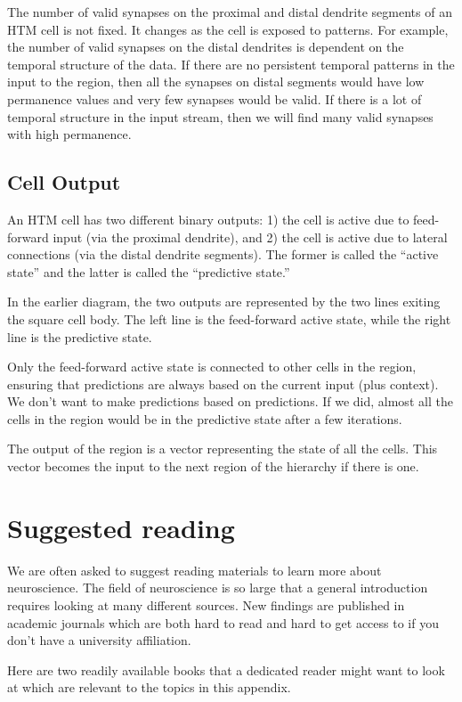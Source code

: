 The number of valid synapses on the proximal and distal dendrite
segments of an HTM cell is not fixed. It changes as the cell is
exposed to patterns. For example, the number of valid synapses on the
distal dendrites is dependent on the temporal structure of the
data. If there are no persistent temporal patterns in the input to the
region, then all the synapses on distal segments would have low
permanence values and very few synapses would be valid. If there is a
lot of temporal structure in the input stream, then we will find many
valid synapses with high permanence.

\subsection*{Cell Output}

An HTM cell has two different binary outputs: 1) the cell is active
due to feed- forward input (via the proximal dendrite), and 2) the
cell is active due to lateral connections (via the distal dendrite
segments). The former is called the ``active state'' and the latter is
called the ``predictive state.''

In the earlier diagram, the two outputs are represented by the two
lines exiting the square cell body. The left line is the feed-forward
active state, while the right line is the predictive state.

Only the feed-forward active state is connected to other cells in the
region, ensuring that predictions are always based on the current
input (plus context). We don't want to make predictions based on
predictions. If we did, almost all the cells in the region would be in
the predictive state after a few iterations.

The output of the region is a vector representing the state of all the
cells. This vector becomes the input to the next region of the
hierarchy if there is one. 

\section*{Suggested reading}

We are often asked to suggest reading materials to learn more about
neuroscience. The field of neuroscience is so large that a general
introduction requires looking at many different sources. New findings
are published in academic journals which are both hard to read and
hard to get access to if you don't have a university affiliation.

Here are two readily available books that a dedicated reader might
want to look at which are relevant to the topics in this appendix.


